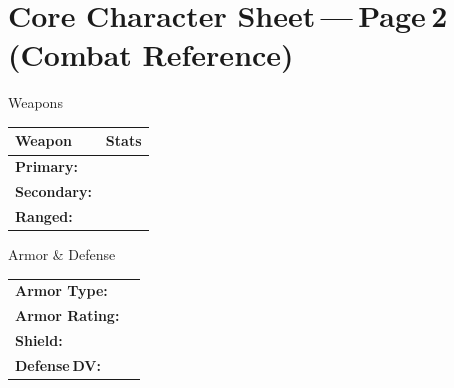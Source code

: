 \documentclass[10pt]{article}
\begin{document}
\section*{Core Character Sheet --- Page 2 (Combat Reference)}

\begin{minipage}[t]{0.48\linewidth}
    \begin{charbox}{Weapons}
        \begin{tabular}{>{\bfseries}p{3cm} p{4.5cm}}
            \toprule
            \textbf{Weapon} & \textbf{Stats}\\
            \midrule
            Primary: & \underline{\hspace{4cm}}\\
            Secondary: & \underline{\hspace{4cm}}\\
            Ranged: & \underline{\hspace{4cm}}\\
            \bottomrule
        \end{tabular}
    \end{charbox}
    
    \vspace{0.5em}
    
    \begin{charbox}{Armor \& Defense}
        \begin{tabular}{>{\bfseries}p{3cm} p{4.5cm}}
            \toprule
            Armor Type: & \underline{\hspace{4cm}}\\
            Armor Rating: & \underline{\hspace{4cm}}\\
            Shield: & \underline{\hspace{4cm}}\\
            Defense DV: & \underline{\hspace{4cm}}\\
            \bottomrule
        \end{tabular}
    \end{charbox}
\end{minipage}
\hfill
\end{document}
